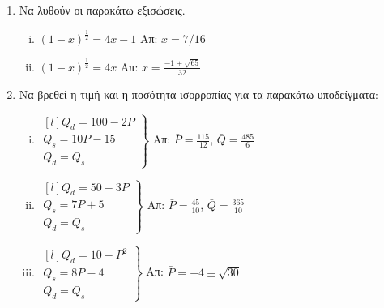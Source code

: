 



\everymath{\displaystyle}
\pagestyle{askhseis}




\begin{center}
  \minibox{\large\bfseries \textcolor{Col1}{Ασκήσεις Επανάληψης}}
\end{center}

\vspace{\baselineskip}


\begin{enumerate}

  \item Να λυθούν οι παρακάτω εξισώσεις.

    \begin{enumerate}[i)]
      \item $ (1-x)^{\frac{1}{2}} = 4x-1 $ \hfill Απ: $ x=7/16 $
      \item $ (1-x)^{\frac{1}{2}} = 4x $ \hfill Απ: $ x = \frac{-1+ \sqrt{65}}{32} $ 
    \end{enumerate}

  \item Να βρεθεί η τιμή και η ποσότητα ισορροπίας για τα παρακάτω υποδείγματα:

    \begin{enumerate}[i)]
      \item 
        $ \left.
          \begin{matrix*}[l]
            Q_{d} = 100 - 2P \\
            Q_{s} = 10P-15 \\
            Q_{d}=Q_{s}
          \end{matrix*} 
        \right\}$ 
        \hfill Απ: $ \bar{P} = \frac{115}{12} $, $ \bar{Q} = \frac{485}{6} $

      \item  
        $ 
        \left.
          \begin{matrix*}[l]
            Q_{d} = 50 - 3P \\
            Q_{s}=7P+5 \\
            Q_{d}=Q_{s}
          \end{matrix*} 
        \right\}$
        \hfill Απ: $ \bar{P} = \frac{45}{10} $, $ \bar{Q} = \frac{365}{10} $ 

      \item 
        $ 
        \left.
          \begin{matrix*}[l]
            Q_{d}=10-P^{2} \\
            Q_{s}=8P-4 \\
            Q_{d}=Q_{s}
          \end{matrix*} 
        \right\}$
        \hfill Απ: $ \bar{P}=-4\pm \sqrt{30} $   


\end{enumerate}
\end{enumerate}
